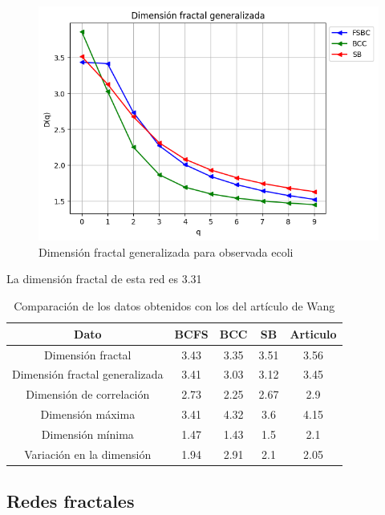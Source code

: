 \begin{figure}[H]
    \centering
    \includegraphics[scale=0.7]{Capitulo4Multifractalidad/imagenes/a_Dqecoli.png}
    \caption{Dimensión fractal generalizada para observada  ecoli}
\end{figure}

La dimensión fractal de esta red es 3.31

\begin{table}[H]
    \centering
    \begin{tabular}{|c|c|c|c|c|}
        \hline
         \textbf{Dato}& \textbf{BCFS} & \textbf{BCC} & \textbf{SB} & \textbf{Articulo} \\
         \hline
         Dimensión fractal & 3.43 & 3.35 & 3.51 & 3.56 \\
         \hline
         Dimensión fractal generalizada  & 3.41 & 3.03 & 3.12 & 3.45 \\
         \hline
         Dimensión de correlación & 2.73 & 2.25 & 2.67 & 2.9 \\
         \hline
         Dimensión máxima & 3.41 & 4.32 & 3.6 & 4.15 \\
         \hline
         Dimensión mínima & 1.47 & 1.43 & 1.5 & 2.1 \\
         \hline
         Variación en la dimensión & 1.94 & 2.91   & 2.1 & 2.05 \\
         \hline
    \end{tabular}
    \caption{Comparación de los datos obtenidos con los del artículo de Wang\cite{Wang2012}}
\end{table}


\subsection{Redes fractales}

